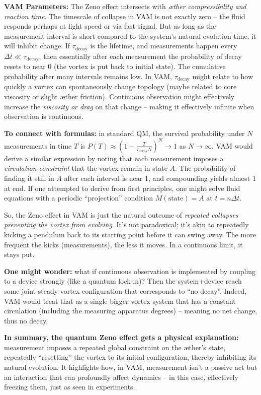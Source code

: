 \documentclass[a4paper, aps,preprint,superscriptaddress, 12pt]{revtex4}
\begin{document}
\textbf{VAM Parameters:} The Zeno effect intersects with \textit{æther compressibility and reaction time}. The timescale of collapse in VAM is not exactly zero – the fluid responds perhaps at light speed or via fast signal. But as long as the measurement interval is short compared to the system’s natural evolution time, it will inhibit change. If $\tau_{\text{decay}}$ is the lifetime, and measurements happen every $\Delta t \ll \tau_{\text{decay}}$, then essentially after each measurement the probability of decay resets to near 0 (the vortex is put back to initial state). The cumulative probability after many intervals remains low. In VAM, $\tau_{\text{decay}}$ might relate to how quickly a vortex can spontaneously change topology (maybe related to core viscosity or slight æther friction). Continuous observation might effectively increase the \textit{viscosity or drag} on that change – making it effectively infinite when observation is continuous.


\textbf{To connect with formulas:} in standard QM, the survival probability under $N$ measurements in time $T$ is $P(T) \approx \left(1 - \frac{T}{\tau_{\text{decay}} N}\right)^N \to 1$ as $N\to\infty$. VAM would derive a similar expression by noting that each measurement imposes a \textit{circulation constraint} that the vortex remain in state $A$. The probability of finding it still in $A$ after each interval is near 1, and compounding yields almost 1 at end. If one attempted to derive from first principles, one might solve fluid equations with a periodic “projection” condition $M(\text{state})=A$ at $t = n\Delta t$.


So, the Zeno effect in VAM is just the natural outcome of \textit{repeated collapses preventing the vortex from evolving}. It’s not paradoxical; it’s akin to repeatedly kicking a pendulum back to its starting point before it can swing away. The more frequent the kicks (measurements), the less it moves. In a continuous limit, it stays put.


\textbf{One might wonder:} what if continuous observation is implemented by coupling to a device strongly (like a quantum lock-in)? Then the system+device reach some joint steady vortex configuration that corresponds to “no decay”. Indeed, VAM would treat that as a single bigger vortex system that has a constant circulation (including the measuring apparatus degrees) – meaning no net change, thus no decay.


\textbf{In summary, the quantum Zeno effect gets a physical explanation:} measurement imposes a repeated global constraint on the æther’s state, repeatedly “resetting” the vortex to its initial configuration, thereby inhibiting its natural evolution. It highlights how, in VAM, measurement isn’t a passive act but an interaction that can profoundly affect dynamics – in this case, effectively freezing them, just as seen in experiments.
\end{document}
